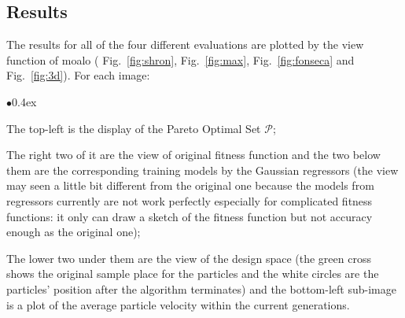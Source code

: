 \documentclass[11pt, runningheads,a4paper]{llncs}
\begin{document}


\subsection{Results}
The results for all of the four different evaluations are plotted by the view function of \ac{moalo} ( Fig.~\ref{fig:shron}, Fig.~\ref{fig:max}, Fig.~\ref{fig:fonseca} and Fig.~\ref{fig:3d}). For each image: 
\begin{list}{$\bullet$}{\itemsep 0.4ex}
\item The top-left is the display of the Pareto Optimal Set $\mathcal{P}$;
\item The right two of it are the view of original fitness function and the two below them are the corresponding training models by the Gaussian regressors (the view may seen a little bit different from the original one because the models from regressors currently are not work perfectly especially for complicated fitness functions: it only can draw a sketch of the fitness function but not accuracy enough as the original one);
\item The lower two under them are the view of the design space (the green cross shows the original sample place for the particles and the white circles are the particles' position after the algorithm terminates) and the bottom-left sub-image is a plot of the average particle velocity within the current generations.
\end{list}
\end{document}
